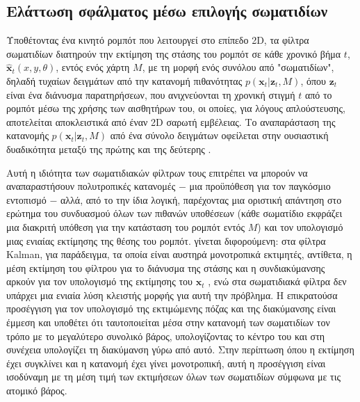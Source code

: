 \subsection{Ελάττωση σφάλματος μέσω επιλογής σωματιδίων}

Υποθέτοντας ένα κινητό ρομπότ που λειτουργεί στο επίπεδο 2D, τα φίλτρα σωματιδίων διατηρούν
την εκτίμηση της στάσης του ρομπότ σε κάθε χρονικό βήμα
$t$, $\hat{\bm{x}}_t (x, y, \theta)$, εντός ενός χάρτη $M$, με τη μορφή ενός συνόλου από
"σωματιδίων", δηλαδή τυχαίων δειγμάτων από την κατανομή πιθανότητας
$p(\bm{x}_t | \bm{z}_t, M)$, όπου $\bm{z}_t$ είναι ένα διάνυσμα παρατηρήσεων,
που ανιχνεύονται τη χρονική στιγμή $t$ από το ρομπότ μέσω της χρήσης των αισθητήρων του, οι οποίες,
για λόγους απλούστευσης, αποτελείται αποκλειστικά από έναν 2D σαρωτή εμβέλειας. Το
αναπαράσταση της κατανομής $p(\bm{x}_t | \bm{z}_t, M)$ από ένα σύνολο
δειγμάτων οφείλεται στην ουσιαστική δυαδικότητα μεταξύ της πρώτης και της δεύτερης
\cite{bswt}.

Αυτή η ιδιότητα των σωματιδιακών φίλτρων τους επιτρέπει να μπορούν να αναπαραστήσουν πολυτροπικές
κατανομές $-$ μια προϋπόθεση για τον παγκόσμιο εντοπισμό $-$ αλλά, από το
την ίδια λογική, παρέχοντας μια οριστική απάντηση στο ερώτημα του συνδυασμού όλων των
πιθανών υποθέσεων (κάθε σωματίδιο εκφράζει μια διακριτή υπόθεση για την
κατάσταση του ρομπότ εντός $M$) και τον υπολογισμό μιας ενιαίας εκτίμησης της θέσης του ρομπότ.
γίνεται διφορούμενη: στα φίλτρα Kalman, για παράδειγμα, τα οποία είναι αυστηρά μονοτροπικά
εκτιμητές, αντίθετα, η μέση εκτίμηση του φίλτρου για το διάνυσμα της στάσης και η
συνδιακύμανσης αρκούν για τον υπολογισμό της εκτίμησης του $\bm{x}_t$ \cite{kalman},
ενώ στα σωματιδιακά φίλτρα δεν υπάρχει μια ενιαία λύση κλειστής μορφής για αυτή την
πρόβλημα. Η επικρατούσα προσέγγιση για τον υπολογισμό της εκτιμώμενης πόζας και της
διακύμανσης είναι έμμεση και υποθέτει ότι ταυτοποιείται μέσα στην κατανομή των
σωματιδίων τον τρόπο με το μεγαλύτερο συνολικό βάρος, υπολογίζοντας το κέντρο του
και στη συνέχεια υπολογίζει τη διακύμανση γύρω από αυτό. Στην περίπτωση όπου η
εκτίμηση έχει συγκλίνει και η κατανομή έχει γίνει μονοτροπική, αυτή η προσέγγιση
είναι ισοδύναμη με τη μέση τιμή των εκτιμήσεων όλων των σωματιδίων σύμφωνα με τις
ατομικό βάρος.

